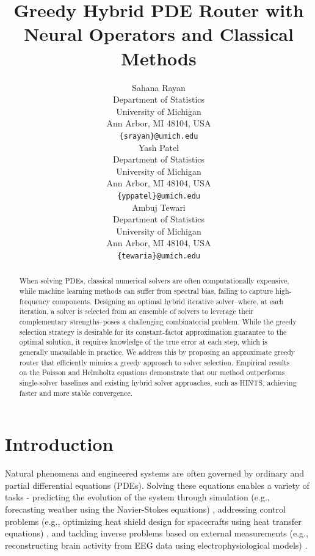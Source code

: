 \documentclass{article} %
\title{Greedy Hybrid PDE Router with \\ Neural Operators and Classical Methods}
\author{Sahana Rayan \\
Department of Statistics\\
University of Michigan\\
Ann Arbor, MI 48104, USA \\
\texttt{\{srayan\}@umich.edu} \\
\And
Yash Patel \\
Department of Statistics\\
University of Michigan\\
Ann Arbor, MI 48104, USA \\
\texttt{\{yppatel\}@umich.edu} \\
\And
Ambuj Tewari \\
Department of Statistics\\
University of Michigan\\
Ann Arbor, MI 48104, USA \\
\texttt{\{tewaria\}@umich.edu} \\
}
\newcommand\ambuj[1]{\textcolor{red}{AT: #1}}
\begin{document}
\maketitle

\begin{abstract}


When solving PDEs, classical numerical solvers are often computationally expensive, while machine learning methods can suffer from spectral bias, failing to capture high-frequency components. Designing an optimal hybrid iterative solver--where, at each iteration, a solver is selected from an ensemble of solvers to leverage their complementary strengths--poses a challenging combinatorial problem. While the greedy selection strategy is desirable for its constant-factor approximation guarantee to the optimal solution, it requires knowledge of the true error at each step, which is generally unavailable in practice. We address this by proposing an approximate greedy router that efficiently mimics a greedy approach to solver selection. Empirical results on the Poisson and Helmholtz equations demonstrate that our method outperforms single-solver baselines and existing hybrid solver approaches, such as HINTS, achieving faster and more stable convergence.

\end{abstract}

\section{Introduction}

Natural phenomena and engineered systems are often governed by ordinary and partial differential equations (PDEs). Solving these equations enables a variety of tasks - predicting the evolution of the system through simulation (e.g., forecasting weather using the Navier-Stokes equations) \citep{kalnay2003atmospheric,bauer2015quiet,staniforth1991semi}, addressing control problems (e.g., optimizing heat shield design for spacecrafts using heat transfer equations) \citep{anderson1989hypersonic,troltzsch2010optimal}, and tackling inverse problems based on external measurements (e.g., reconstructing brain activity from EEG data using electrophysiological models) \citep{baillet2001electromagnetic,grech2008review}. 
\end{document}
